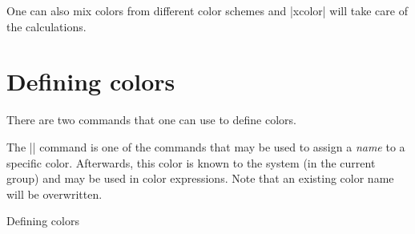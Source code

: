 One can also mix colors from different color schemes and |xcolor| will take care of the calculations.

\section{Defining colors}

There are two commands that one can use to define colors.

\begin{macro}{\definecolor} 
The |\definecolor| command is one of the commands that may be used to assign a \textit{name} to a specific color. Afterwards, this color is known to the system (in the current group) and may be used in color expressions. Note that an existing color name will be overwritten.
\end{macro} 

\begin{texexample}{Defining colors}{}

\color{myblack}\lorem
\end{texexample}











